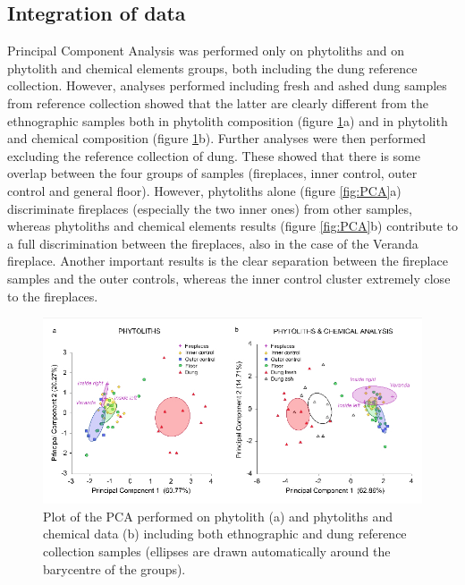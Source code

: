 \documentclass[authoryear,preprint,review,12pt]{elsarticle}
\begin{document}
\subsection{Integration of data}
\label{subsec:3.3}	
Principal Component Analysis was performed only on phytoliths and on phytolith and chemical elements groups, both including the dung reference collection. However, analyses performed including fresh and ashed dung samples from reference collection showed that the latter are clearly different from the ethnographic samples both in phytolith composition (figure \ref{fig:dungPCA}a) and in phytolith and chemical composition (figure \ref{fig:dungPCA}b). Further analyses were then performed excluding the reference collection of dung. These showed that there is some overlap between the four groups of samples (fireplaces, inner control, outer control and general floor). However, phytoliths alone (figure \ref{fig:PCA}a) discriminate fireplaces (especially the two inner ones) from other samples, whereas phytoliths and chemical elements results (figure \ref{fig:PCA}b) contribute to a full discrimination between the fireplaces, also in the case of the Veranda fireplace. Another important results is the clear separation between the fireplace samples and the outer controls, whereas the inner control cluster extremely close to the fireplaces.

\begin{figure}[ht!]
  \begin{center}
    \includegraphics[width=15cm]{figures/PCA_dung}
    \caption{Plot of the PCA performed on phytolith (a) and phytoliths and chemical data (b) including both ethnographic and dung reference collection samples (ellipses are drawn automatically around the barycentre of the groups).}
    \label{fig:dungPCA}
  \end{center}
\end{figure}
\end{document}
